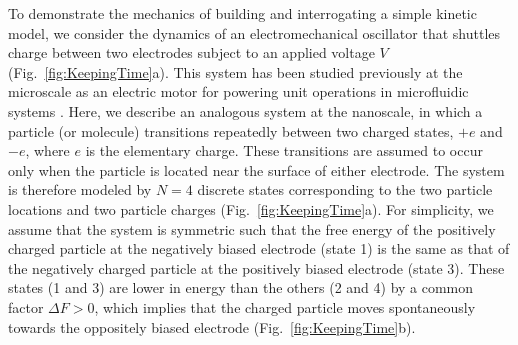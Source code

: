 \begin{appendices}
To demonstrate the mechanics of building and interrogating a simple kinetic model, we consider the dynamics of an electromechanical oscillator that shuttles charge between two electrodes subject to an applied voltage $V$ (Fig.~\ref{fig:KeepingTime}a). This system has been studied previously at the microscale as an electric motor for powering unit operations in microfluidic systems \cite{bishop2018contact,drews2015contact}.  Here, we describe an analogous system at the nanoscale, in which a particle (or molecule) transitions repeatedly between two charged states, $+e$ and $-e$, where $e$ is the elementary charge.  These transitions are assumed to occur only when the particle is located near the surface of either electrode.  The system is therefore modeled by $N=4$ discrete states corresponding to the two particle locations and two particle charges (Fig.~\ref{fig:KeepingTime}a).  For simplicity, we assume that the system is symmetric such that the free energy of the positively charged particle at the negatively biased electrode (state 1) is the same as that of the negatively charged particle at the positively biased electrode (state 3).  These states (1 and 3) are lower in energy than the others (2 and 4) by a common factor $\Delta F>0$, which implies that the charged particle moves spontaneously towards the oppositely biased electrode (Fig.~\ref{fig:KeepingTime}b).


\end{appendices}
